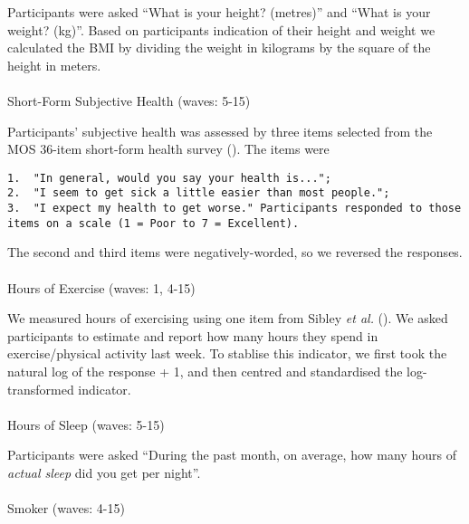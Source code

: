 \documentclass[
  singlecolumn,
  9pt]{scrartcl}
\makeatletter
\let\oldparagraph\paragraph
\renewcommand{\paragraph}{
    \@ifstar
      \xxxParagraphStar
      \xxxParagraphNoStar
  }
\newcommand{\xxxParagraphStar}[1]{\oldparagraph*{#1}\mbox{}}
\newcommand{\xxxParagraphNoStar}[1]{\oldparagraph{#1}\mbox{}}
\makeatother
\begin{document}
Participants were asked ``What is your height? (metres)'' and ``What is
your weight? (kg)''. Based on participants indication of their height
and weight we calculated the BMI by dividing the weight in kilograms by
the square of the height in meters.

\paragraph{Short-Form Subjective Health (waves:
5-15)}\label{short-form-subjective-health-waves-5-15}

Participants' subjective health was assessed by three items selected
from the MOS 36-item short-form health survey
(). The items were

\begin{verbatim}
1.  "In general, would you say your health is...";
2.  "I seem to get sick a little easier than most people.";
3.  "I expect my health to get worse." Participants responded to those items on a scale (1 = Poor to 7 = Excellent).
\end{verbatim}

The second and third items were negatively-worded, so we reversed the
responses.

\paragraph{Hours of Exercise (waves: 1,
4-15)}\label{hours-of-exercise-waves-1-4-15}

We measured hours of exercising using one item from Sibley \emph{et al.}
(). We asked participants to estimate and
report how many hours they spend in exercise/physical activity last
week. To stablise this indicator, we first took the natural log of the
response + 1, and then centred and standardised the log-transformed
indicator.

\paragraph{Hours of Sleep (waves:
5-15)}\label{hours-of-sleep-waves-5-15}

Participants were asked ``During the past month, on average, how many
hours of \emph{actual sleep} did you get per night''.

\paragraph{Smoker (waves: 4-15)}\label{smoker-waves-4-15}
\end{document}
